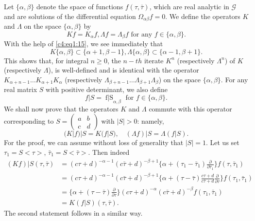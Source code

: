 Let \pageoriginale $\{\alpha, \beta\}$ denote the space of functions
$f(\tau,\bar{\tau})$, which are real analytic in $\mathscr{G}$ and are
solutions of the differential equation $\Omega_{\alpha\beta}f=0$. We
define the operators $K$ and $\Lambda$ on the space $\{\alpha, \beta\}$
by
\begin{equation*}
K f = K_{\alpha} f, \Lambda f = \Lambda_{\beta} f \text{ for any }
f\in \{\alpha, \beta\}. \tag{16}\label{c4:eq1:16}
\end{equation*}
With the help of \eqref{c4:eq1:15}, we see immediately that 
$$
K\{\alpha, \beta\} \subset \{\alpha + 1, \beta-1\}, \Lambda\{\alpha,
\beta\} \subset \{\alpha-1, \beta+1\}.
$$
This shows that, for integral $n \geq 0$, the $n-th$ iterate $K^n$
(respectively $\Lambda^n$) of $K$ (respectively $\Lambda$), is
well-defined and is identical with the operator $K_{\alpha+n-1} \ldots
K_{\alpha+1}K_{\alpha}$ (respectively $\Lambda_{\beta+n-1} \ldots
\Lambda_{\beta+1} \Lambda_{\beta}$) on the space $\{\alpha,
\beta\}$. For any real matrix $S$ with positive determinant, we also
define
$$
f|S =\mathop{f|S}_{\alpha,\beta} \text{ for } f\in \{\alpha,
\beta\}. 
$$
We shall now prove that the operators $K$ and $\Lambda$ commute with
this operator corresponding to
$S=\left(\begin{smallmatrix} a&b\\c&d\end{smallmatrix}\right)$ with
  $|S|>0$: namely,
\begin{equation*}
(K|f)|S = K(f|S), \quad (\Lambda f)|S
= \Lambda(f|S). \tag{17}\label{c4:eq1:17}
\end{equation*}
For the proof, we can assume without loss of generality that
$|S|=1$. Let us set $\tau_1=S<\tau>$, $\bar{\tau}_1 =
S<\bar{\tau}>$. Then indeed
\begin{align*}
(Kf) |S (\tau, \bar{\tau}) &= (c\tau
  +d)^{-\alpha-1}(c\bar{\tau}+d)^{-\beta+1} \{\alpha +
  (\tau_1-\bar{\tau}_1) \frac{\partial}{\partial \tau_1}\} f
  (\tau,\bar{\tau}_1)\\
& = (c\tau+d)^{-\alpha-1} (c\bar{\tau}+d)^{-\beta+1} \{\alpha +
  (\tau-\bar{\tau}) \frac{c\tau+d}{c\bar{\tau}+d}
  \frac{\partial}{\partial \tau}\} f(\tau_1,\bar{\tau}_1)\\
& = \{\alpha + (\tau-\bar{\tau}) \frac{\partial}{\partial \tau}\}
  (c\tau+d)^{-\alpha} (c\bar{\tau}+d)^{-\beta} f(\tau_1,
  \bar{\tau}_1)\\
& = K(f|S)(\tau,\bar{\tau}).
\end{align*}
The second \pageoriginale statement follows in a similar way.

